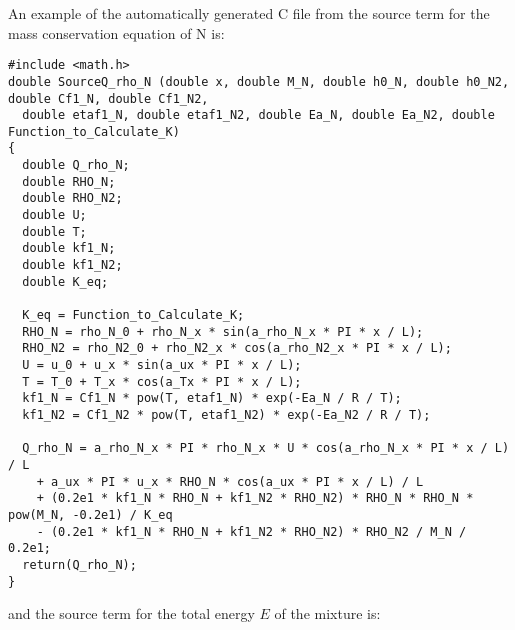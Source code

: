 \documentclass[10pt]{article}
\begin{document}
An example of the automatically generated C file from the source term for the mass conservation equation of N is:
\begin{small}
 \begin{verbatim}
#include <math.h>
double SourceQ_rho_N (double x, double M_N, double h0_N, double h0_N2, double Cf1_N, double Cf1_N2,
  double etaf1_N, double etaf1_N2, double Ea_N, double Ea_N2, double Function_to_Calculate_K)
{
  double Q_rho_N;
  double RHO_N;
  double RHO_N2;
  double U;
  double T;
  double kf1_N;
  double kf1_N2;
  double K_eq;

  K_eq = Function_to_Calculate_K;
  RHO_N = rho_N_0 + rho_N_x * sin(a_rho_N_x * PI * x / L);
  RHO_N2 = rho_N2_0 + rho_N2_x * cos(a_rho_N2_x * PI * x / L);
  U = u_0 + u_x * sin(a_ux * PI * x / L);
  T = T_0 + T_x * cos(a_Tx * PI * x / L);
  kf1_N = Cf1_N * pow(T, etaf1_N) * exp(-Ea_N / R / T);
  kf1_N2 = Cf1_N2 * pow(T, etaf1_N2) * exp(-Ea_N2 / R / T);

  Q_rho_N = a_rho_N_x * PI * rho_N_x * U * cos(a_rho_N_x * PI * x / L) / L
    + a_ux * PI * u_x * RHO_N * cos(a_ux * PI * x / L) / L
    + (0.2e1 * kf1_N * RHO_N + kf1_N2 * RHO_N2) * RHO_N * RHO_N * pow(M_N, -0.2e1) / K_eq
    - (0.2e1 * kf1_N * RHO_N + kf1_N2 * RHO_N2) * RHO_N2 / M_N / 0.2e1;
  return(Q_rho_N);
}
 \end{verbatim}
\end{small}
%
and the source term for the total energy $E$ of the mixture is:
%
\end{document}
